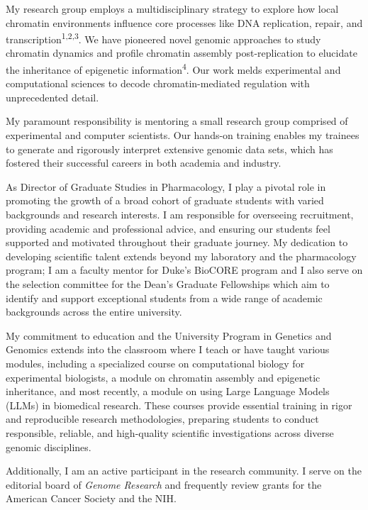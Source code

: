 \begin{statement}
My research group employs a multidisciplinary strategy to explore how local chromatin environments influence core processes like DNA replication, repair, and transcription\textsuperscript{1,2,3}. We have pioneered novel genomic approaches to study chromatin dynamics and profile chromatin assembly post-replication to elucidate the inheritance of epigenetic information\textsuperscript{4}. Our work melds experimental and computational sciences to decode chromatin-mediated regulation with unprecedented detail.

My paramount responsibility is mentoring a small research group comprised of experimental and computer scientists. Our hands-on training enables my trainees to generate and rigorously interpret extensive genomic data sets, which has fostered their successful careers in both academia and industry.

As Director of Graduate Studies in Pharmacology, I play a pivotal role in promoting the growth of a broad cohort of graduate students with varied backgrounds and research interests. I am responsible for overseeing recruitment, providing academic and professional advice, and ensuring our students feel supported and motivated throughout their graduate journey. My dedication to developing scientific talent extends beyond my laboratory and the pharmacology program; I am a faculty mentor for Duke's BioCORE program and I also serve on the selection committee for the Dean's Graduate Fellowships which aim to identify and support exceptional students from a wide range of academic backgrounds across the entire university.

My commitment to education and the University Program in Genetics and Genomics extends into the classroom where I teach or have taught various modules, including a specialized course on computational biology for experimental biologists, a module on chromatin assembly and epigenetic inheritance, and most recently, a module on using Large Language Models (LLMs) in biomedical research. These courses provide essential training in rigor and reproducible research methodologies, preparing students to conduct responsible, reliable, and high-quality scientific investigations across diverse genomic disciplines.

Additionally, I am an active participant in the research community. I serve on the editorial board of \textit{Genome Research} and frequently review grants for the American Cancer Society and the NIH.  


\end{statement}
